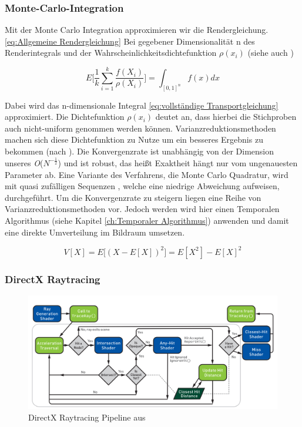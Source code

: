 \subsubsection{Monte-Carlo-Integration}
Mit der Monte Carlo Integration approximieren wir die Rendergleichung.\ref{eq:Allgemeine Rendergleichung} 
Bei gegebener Dimensionalität n des Renderintegrals und der 
Wahrscheinlichkeitsdichtefunktion $\rho(x_i)$
(siehe auch \cite{KK02})

\begin{equation}\label{eq:Monte-Carlo}
    E\biggl[\frac{1}{k}\sum_{i=1}^{k}\frac{f(X_{i})}{\rho(X_{i})}\biggl] = \int_{[0,1]^{n}}f(x)dx
\end{equation}

Dabei wird das n-dimensionale Integral \ref{eq:vollständige Transportgleichung} approximiert. Die Dichtefunktion $\rho(x_i)$ 
deutet an, dass hierbei die Stichproben auch nicht-uniform genommen werden können. 
Varianzreduktionsmethoden machen sich diese Dichtefunktion zu Nutze um 
ein besseres Ergebnis zu bekommen (nach \cite{caflisch_1998}).
Die Konvergenzrate ist unabhängig von der Dimension unseres 
\textit{O}($N^{-\frac{1}{2}}$) und ist robust, das heißt Exaktheit hängt nur vom ungenauesten Parameter ab.
Eine Variante des Verfahrens, die Monte Carlo Quadratur, wird mit quasi zufälligen Sequenzen , 
welche eine niedrige Abweichung aufweisen, durchgeführt.
Um die Konvergenzrate zu steigern liegen eine Reihe von Varianzreduktionsmethoden vor. Jedoch werden wird hier 
einen Temporalen Algorithmus (siehe Kapitel \ref{ch:Temporaler Algorithmus}) anwenden und damit eine direkte Umverteilung im Bildraum 
umsetzen.

\begin{equation}\label{eq:Monte-Carlo-Varianz}
    V[X] = E\biggl[(X-E[X])^{2}\biggl] = E[X^{2}]
    - E[X]^{2}
\end{equation}

\subsubsection{DirectX Raytracing}

\begin{figure}[H]
    \centering
    \includegraphics[width=\linewidth]{content/PathTracer/Bilder/DirectXRaytracingPipeline.png}
    \caption{DirectX Raytracing Pipeline aus \cite{Haines2019}}
    \label{pic:DirectXRaytracingPipeline}
\end{figure}


